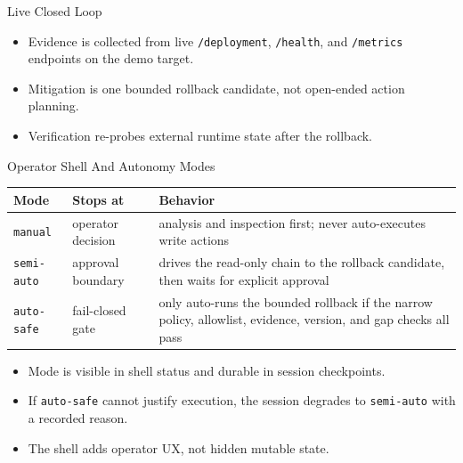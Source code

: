 \documentclass[aspectratio=169]{beamer}
\begin{document}
\begin{frame}{Live Closed Loop}
  \centering

  \vspace{0.9em}
  \begin{itemize}
    \item Evidence is collected from live \texttt{/deployment}, \texttt{/health}, and
      \texttt{/metrics} endpoints on the demo target.
    \item Mitigation is one bounded rollback candidate, not open-ended action planning.
    \item Verification re-probes external runtime state after the rollback.
  \end{itemize}
\end{frame}

\begin{frame}{Operator Shell And Autonomy Modes}
  \small
  \begin{tabular}{p{} p{} p{}}
    \toprule
    \textbf{Mode} & \textbf{Stops at} & \textbf{Behavior} \\
    \midrule
    \texttt{manual} & operator decision & analysis and inspection first; never auto-executes write actions \\
    \texttt{semi-auto} & approval boundary & drives the read-only chain to the rollback candidate, then waits for explicit approval \\
    \texttt{auto-safe} & fail-closed gate & only auto-runs the bounded rollback if the narrow policy, allowlist, evidence, version, and gap checks all pass \\
    \bottomrule
  \end{tabular}

  \vspace{0.8em}
  \begin{itemize}
    \item Mode is visible in shell status and durable in session checkpoints.
    \item If \texttt{auto-safe} cannot justify execution, the session degrades to
      \texttt{semi-auto} with a recorded reason.
    \item The shell adds operator UX, not hidden mutable state.
  \end{itemize}
\end{frame}
\end{document}

